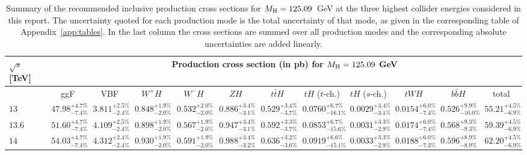 \begin{landscape}
\begin{table}[ht!]
\caption{Summary of the recommended inclusive production cross sections for
$M_\mathrm{H} = 125.09$~GeV at the three highest collider energies considered in this
report. The uncertainty quoted for each production mode is the total
uncertainty of that mode, as given in the corresponding table of
Appendix~\ref{app:tables}. In the last column the cross sections are summed
over all production modes and the corresponding absolute uncertainties are
added linearly.}
\label{tab:summary_125p09}
\begin{center}%
\begin{small}%
\begin{tabular}{lccccccccccc}%
\toprule
$\sqrt{s}$ [TeV] & \multicolumn{11}{c}{Production cross section (in pb) for $M_\mathrm{H} = 125.09$ GeV}
\\
\midrule
& ggF & VBF & $W^+H$ & $W^-H$ & $ZH$ & $t\bar{t}H$ & $tH$ ($t$-ch.) & $tH$ ($s$-ch.) & $tWH$ & $b\bar{b}H$ & total \\
\midrule
$13$ & $47.98^{+4.7\%}_{-7.4\%}$ & $3.811^{+2.5\%}_{-2.4\%}$ & $0.848^{+1.9\%}_{-2.0\%}$ & $0.532^{+2.0\%}_{-2.0\%}$ & $0.886^{+3.4\%}_{-3.1\%}$ & $0.529^{+3.4\%}_{-3.7\%}$ & $0.0760^{+6.7\%}_{-16.1\%}$ & $0.0029^{+3.4\%}_{-3.1\%}$ & $0.0154^{+6.0\%}_{-7.4\%}$ & $0.526^{+9.9\%}_{-10.0\%}$ & $55.21^{+4.5\%}_{-6.9\%}$ \\[0.2cm]
$13.6$ & $51.60^{+4.7\%}_{-7.4\%}$ & $4.109^{+2.5\%}_{-2.4\%}$ & $0.898^{+1.9\%}_{-2.0\%}$ & $0.567^{+1.9\%}_{-2.0\%}$ & $0.947^{+3.4\%}_{-3.1\%}$ & $0.592^{+3.3\%}_{-3.7\%}$ & $0.0853^{+6.7\%}_{-15.6\%}$ & $0.0031^{+3.3\%}_{-2.9\%}$ & $0.0174^{+6.0\%}_{-7.4\%}$ & $0.568^{+9.3\%}_{-9.3\%}$ & $59.39^{+4.5\%}_{-6.9\%}$ \\[0.2cm]
$14$ & $54.03^{+4.7\%}_{-7.4\%}$ & $4.312^{+2.4\%}_{-2.4\%}$ & $0.930^{+1.9\%}_{-2.0\%}$ & $0.591^{+1.9\%}_{-2.0\%}$ & $0.988^{+3.4\%}_{-3.2\%}$ & $0.636^{+3.2\%}_{-3.6\%}$ & $0.0919^{+6.6\%}_{-15.1\%}$ & $0.0033^{+3.3\%}_{-2.9\%}$ & $0.0188^{+6.0\%}_{-7.3\%}$ & $0.596^{+8.9\%}_{-8.9\%}$ & $62.20^{+4.5\%}_{-6.9\%}$ \\
\bottomrule
\end{tabular}%
\end{small}%
\end{center}%
\end{table}
\end{landscape}

